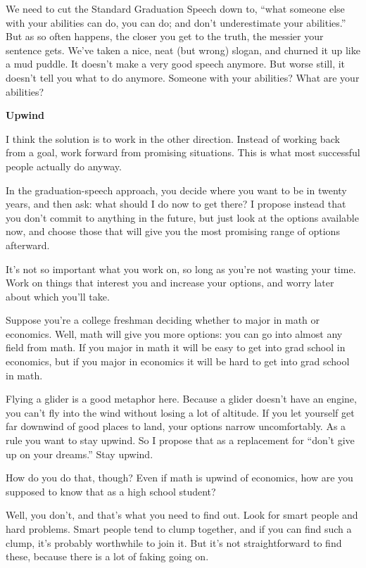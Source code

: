 \documentclass[12pt]{book}
\begin{document}
We need to cut the Standard Graduation Speech down to, ``what someone
else with your abilities can do, you can do; and don't underestimate
your abilities.'' But as so often happens, the closer you get to the
truth, the messier your sentence gets. We've taken a nice, neat (but
wrong) slogan, and churned it up like a mud puddle. It doesn't make a
very good speech anymore. But worse still, it doesn't tell you what to
do anymore. Someone with your abilities? What are your abilities?

\textbf{Upwind}

I think the solution is to work in the other direction. Instead of
working back from a goal, work forward from promising situations. This
is what most successful people actually do anyway.

In the graduation-speech approach, you decide where you want to be in
twenty years, and then ask: what should I do now to get there? I propose
instead that you don't commit to anything in the future, but just look
at the options available now, and choose those that will give you the
most promising range of options afterward.

It's not so important what you work on, so long as you're not wasting
your time. Work on things that interest you and increase your options,
and worry later about which you'll take.

Suppose you're a college freshman deciding whether to major in math or
economics. Well, math will give you more options: you can go into almost
any field from math. If you major in math it will be easy to get into
grad school in economics, but if you major in economics it will be hard
to get into grad school in math.

Flying a glider is a good metaphor here. Because a glider doesn't have
an engine, you can't fly into the wind without losing a lot of altitude.
If you let yourself get far downwind of good places to land, your
options narrow uncomfortably. As a rule you want to stay upwind. So I
propose that as a replacement for ``don't give up on your dreams.'' Stay
upwind.

How do you do that, though? Even if math is upwind of economics, how are
you supposed to know that as a high school student?

Well, you don't, and that's what you need to find out. Look for smart
people and hard problems. Smart people tend to clump together, and if
you can find such a clump, it's probably worthwhile to join it. But it's
not straightforward to find these, because there is a lot of faking
going on.
\end{document}
